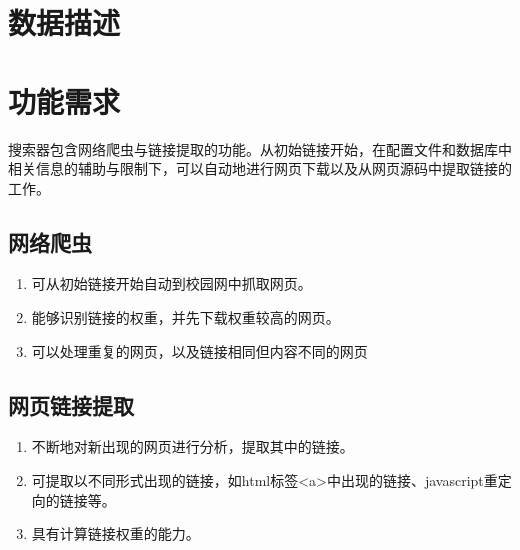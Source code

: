 \section{数据描述}


\section{功能需求}
搜索器包含网络爬虫与链接提取的功能。从初始链接开始，在配置文件和数据库中相关信息的辅助与限制下，可以自动地进行网页下载以及从网页源码中提取链接的工作。
\subsection{网络爬虫}
\begin{enumerate}
\item 可从初始链接开始自动到校园网中抓取网页。
\item 能够识别链接的权重，并先下载权重较高的网页。
\item 可以处理重复的网页，以及链接相同但内容不同的网页
\end{enumerate}
\subsection{网页链接提取}
\begin{enumerate}
\item 不断地对新出现的网页进行分析，提取其中的链接。
\item 可提取以不同形式出现的链接，如html标签<a>中出现的链接、javascript重定向的链接等。
\item 具有计算链接权重的能力。
\end{enumerate}

